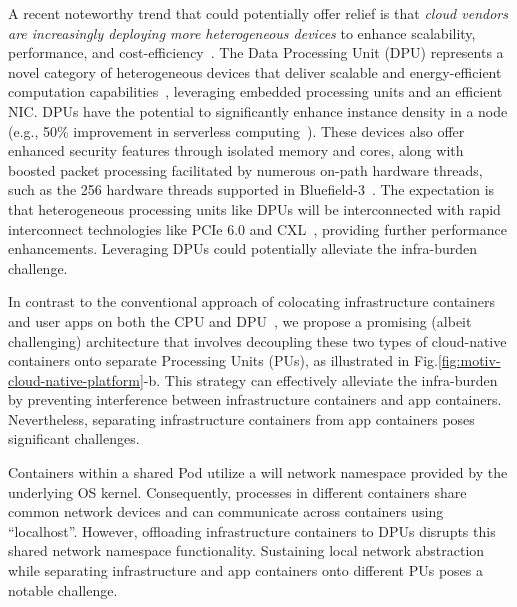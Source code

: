A recent noteworthy trend that could potentially offer relief is that \emph{cloud vendors are increasingly deploying more heterogeneous devices} to enhance scalability, performance, and cost-efficiency~\cite{amazon-f1, silberstein2013gpufs, kim2014gpunet, firestone2018azure, china-mobile-smartnic, huawei-smartnic, xilinx-fpga-huawei, ali-fpga, baidu-fpga}.
The Data Processing Unit (DPU) represents a novel category of heterogeneous devices that deliver scalable and energy-efficient computation capabilities~\cite{234944}, leveraging embedded processing units and an efficient NIC.
DPUs have the potential to significantly enhance instance density in a node (e.g., 50\% improvement in serverless computing~\cite{10.1145/3503222.3507732}).
These devices also offer enhanced security features through isolated memory and cores, along with boosted packet processing facilitated by numerous on-path hardware threads, such as the 256 hardware threads supported in Bluefield-3~\cite{bf-3}.
The expectation is that heterogeneous processing units like DPUs will be interconnected with rapid interconnect technologies like PCIe 6.0 and CXL~\cite{intel-cxl}, providing further performance enhancements.
Leveraging DPUs could potentially alleviate the infra-burden challenge.

In contrast to the conventional approach of colocating infrastructure containers and user apps on both the CPU and DPU~\cite{redhat-openshift},
we propose a promising (albeit challenging) architecture that involves decoupling these two types of cloud-native containers onto separate Processing Units (PUs), as illustrated in Fig.\ref{fig:motiv-cloud-native-platform}-b.
This strategy can effectively alleviate the infra-burden by preventing interference between infrastructure containers and app containers.
Nevertheless, separating infrastructure containers from app containers poses significant challenges.

Containers within a shared Pod utilize a will network namespace provided by the underlying OS kernel.
Consequently, processes in different containers share common network devices and can communicate across containers using ``localhost''.
However, offloading infrastructure containers to DPUs disrupts this shared network namespace functionality.
Sustaining local network abstraction while separating infrastructure and app containers onto different PUs poses a notable challenge.


